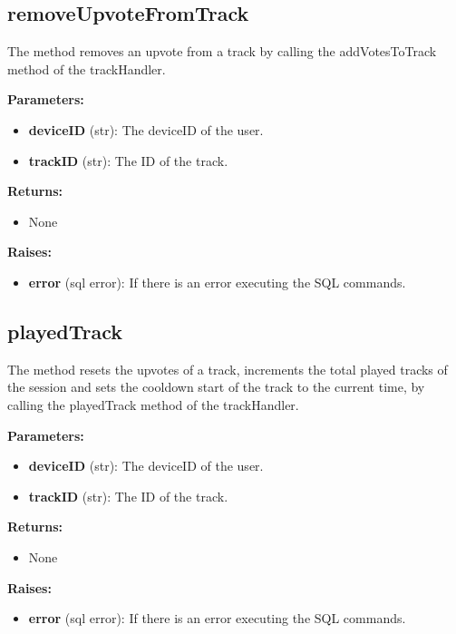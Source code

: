\documentclass[oneside, nenglish]{sdqtechreport}
\begin{document}
\begin{itemize}
\subsection{removeUpvoteFromTrack}

The method removes an upvote from a track by calling the addVotesToTrack method of the trackHandler.

\textbf{Parameters:}

\begin{itemize}
    \item \textbf{deviceID} (str): The deviceID of the user.
    \item \textbf{trackID} (str): The ID of the track.
\end{itemize}

\textbf{Returns:}

\begin{itemize}
    \item None
\end{itemize}

\textbf{Raises:}

\begin{itemize}
    \item \textbf{error} (sql error): If there is an error executing the SQL commands.
\end{itemize}


\subsection{playedTrack}

The method resets the upvotes of a track, increments the total played tracks of the session and sets the cooldown start of the track to the current time, by calling the playedTrack method of the trackHandler.

\textbf{Parameters:}

\begin{itemize}
    \item \textbf{deviceID} (str): The deviceID of the user.
    \item \textbf{trackID} (str): The ID of the track.
\end{itemize}

\textbf{Returns:}

\begin{itemize}
    \item None
\end{itemize}

\textbf{Raises:}

\begin{itemize}
    \item \textbf{error} (sql error): If there is an error executing the SQL commands.
\end{itemize}



\end{itemize}
\end{document}
